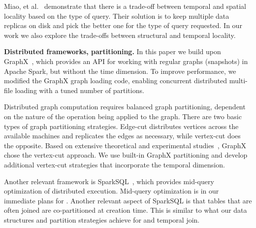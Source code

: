 Miao, et al.~\cite{DBLP:journals/tos/MiaoHLWYZPCC15} demonstrate that
there is a trade-off between temporal and spatial locality based on the
type of query.  Their solution is to keep multiple data replicas on
disk and pick the better one for the type of query requested.  In our
work we also explore the trade-offs between structural and temporal
locality.  

{\bf Distributed frameworks, partitioning.}  In this paper we build
upon GraphX~\cite{DBLP:conf/osdi/GonzalezXDCFS14}, which provides an
API for working with regular graphs (snapshots) in Apache Spark, but
without the time dimension.  To improve performance, we modified the
GraphX graph loading code, enabling concurrent distributed multi-file
loading with a tuned number of partitions.

Distributed graph computation requires balanced graph partitioning,
dependent on the nature of the operation being applied to the graph.
There are two basic types of graph partitioning strategies.  Edge-cut
distributes vertices across the available machines and replicates the
edges as necessary, while vertex-cut does the opposite.  Based on
extensive theoretical and experimental studies~\cite{Gonzalez2012},
GraphX chose the vertex-cut approach.  We use built-in GraphX
partitioning and develop additional vertex-cut strategies that
incorporate the temporal dimension.

Another relevant framework is SparkSQL~\cite{Xin2013Shark}, which
provides mid-query optimization of distributed execution.  Mid-query
optimization is in our immediate plans for \ql.  Another relevant
aspect of SparkSQL is that tables that are often joined are
co-partitioned at creation time.  This is similar to what our data
structures and partition strategies achieve for  and
temporal join.


